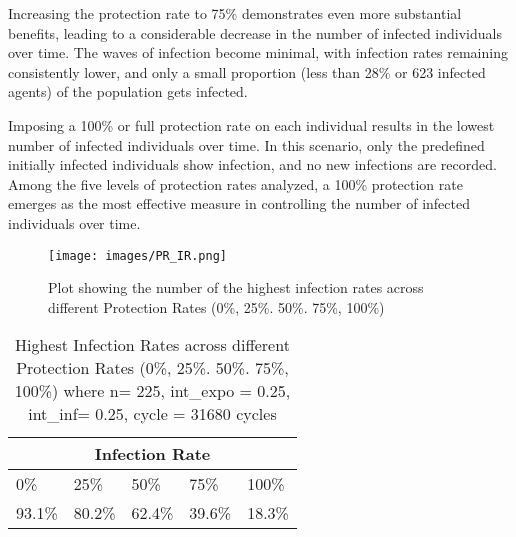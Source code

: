 Increasing the protection rate to 75\% demonstrates even more substantial benefits, leading to a considerable decrease in the number of infected individuals over time. The waves of infection become minimal, with infection rates remaining consistently lower, and only a small proportion (less than 28\% or 623 infected agents) of the population gets infected.

Imposing a 100\% or full protection rate on each individual results in the lowest number of infected individuals over time. In this scenario, only the predefined initially infected individuals show infection, and no new infections are recorded. Among the five levels of protection rates analyzed, a 100\% protection rate emerges as the most effective measure in controlling the number of infected individuals over time.

 

\begin{figure}[H]
	\centering
	\texttt{[image: images/PR\_IR.png]}
	\caption{Plot showing the number of the highest infection rates across different Protection Rates (0\%, 25\%. 50\%. 75\%, 100\%) }
	\label{fig:15}
\end{figure}

\begin{table}[H]
	\centering
	\begin{tabularx}{\textwidth}{|X|X|X|X|X|}
		\hline
		\multicolumn{5}{|c|}{\textbf{Infection Rate}} \\
		\hline
		0\%& 25\% & 50\% & 75\% & 100\% \\
		\hline
		93.1\% & 80.2\% & 62.4\% & 39.6\% & 18.3\%\\
		\hline
	\end{tabularx}
	\caption{Highest Infection Rates across different Protection Rates (0\%, 25\%. 50\%. 75\%, 100\%) where n= 225, int\_expo = 0.25, int\_inf= 0.25, cycle = 31680 cycles }
	\label{tab:PR_IR}
\end{table}

